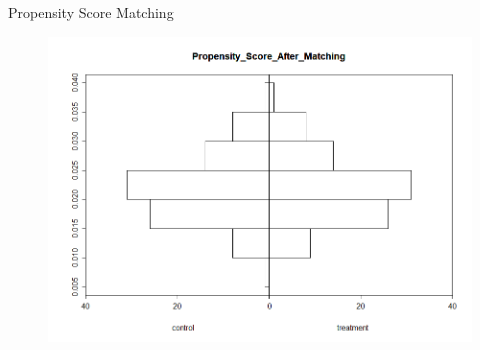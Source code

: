 \documentclass[mathserif, xcolor=table]{beamer}
\begin{document}
\begin{frame}{Propensity Score Matching}
	\begin{figure}
		\centering
		\includegraphics[width=\textwidth]{pic/Aftermatching.png}
	\end{figure}
\end{frame}
\end{document}
